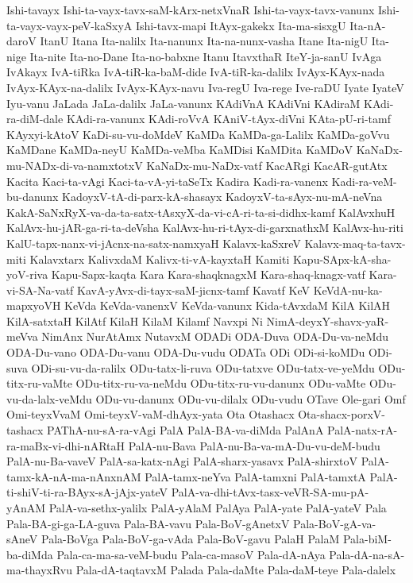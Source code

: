 {Ishi-tavayx
Ishi-ta-vayx-tavx-saM-kArx-netxVnaR
Ishi-ta-vayx-tavx-vanunx
Ishi-ta-vayx-vayx-peV-kaSxyA
Ishi-tavx-mapi
ItAyx-gakekx
Ita-ma-sisxgU
Ita-nA-daroV
ItanU
Itana
Ita-nalilx
Ita-nanunx
Ita-na-nunx-vasha
Itane
Ita-nigU
Ita-nige
Ita-nite
Ita-no-Dane
Ita-no-babxne
Itanu
ItavxthaR
IteY-ja-sanU
IvAga
IvAkayx
IvA-tiRka
IvA-tiR-ka-baM-dide
IvA-tiR-ka-dalilx
IvAyx-KAyx-nada
IvAyx-KAyx-na-dalilx
IvAyx-KAyx-navu
Iva-regU
Iva-rege
Ive-raDU
Iyate
IyateV
Iyu-vanu
JaLada
JaLa-dalilx
JaLa-vanunx
KAdiVnA
KAdiVni
KAdiraM
KAdi-ra-diM-dale
KAdi-ra-vanunx
KAdi-roVvA
KAniV-tAyx-diVni
KAta-pU-ri-tamf
KAyxyi-kAtoV
KaDi-su-vu-doMdeV
KaMDa
KaMDa-ga-Lalilx
KaMDa-goVvu
KaMDane
KaMDa-neyU
KaMDa-veMba
KaMDisi
KaMDita
KaMDoV
KaNaDx-mu-NADx-di-va-namxtotxV
KaNaDx-mu-NaDx-vatf
KacARgi
KacAR-gutAtx
Kacita
Kaci-ta-vAgi
Kaci-ta-vA-yi-taSeTx
Kadira
Kadi-ra-vanenx
Kadi-ra-veM-bu-danunx
KadoyxV-tA-di-parx-kA-shasayx
KadoyxV-ta-sAyx-nu-mA-neVna
KakA-SaNxRyX-va-da-ta-satx-tAsxyX-da-vi-cA-ri-ta-si-didhx-kamf
KalAvxhuH
KalAvx-hu-jAR-ga-ri-ta-deVsha
KalAvx-hu-ri-tAyx-di-garxnathxM
KalAvx-hu-riti
KalU-tapx-nanx-vi-jAcnx-na-satx-namxyaH
Kalavx-kaSxreV
Kalavx-maq-ta-tavx-miti
Kalavxtarx
KalivxdaM
Kalivx-ti-vA-kayxtaH
Kamiti
Kapu-SApx-kA-sha-yoV-riva
Kapu-Sapx-kaqta
Kara
Kara-shaqknagxM
Kara-shaq-knagx-vatf
Kara-vi-SA-Na-vatf
KavA-yAvx-di-tayx-saM-jicnx-tamf
Kavatf
KeV
KeVdA-nu-ka-mapxyoVH
KeVda
KeVda-vanenxV
KeVda-vanunx
Kida-tAvxdaM
KilA
KilAH
KilA-satxtaH
KilAtf
KilaH
KilaM
Kilamf
Navxpi
Ni
NimA-deyxY-shavx-yaR-meVva
NimAnx
NurAtAmx
NutavxM
ODADi
ODA-Duva
ODA-Du-va-neMdu
ODA-Du-vano
ODA-Du-vanu
ODA-Du-vudu
ODATa
ODi
ODi-si-koMDu
ODi-suva
ODi-su-vu-da-ralilx
ODu-tatx-li-ruva
ODu-tatxve
ODu-tatx-ve-yeMdu
ODu-titx-ru-vaMte
ODu-titx-ru-va-neMdu
ODu-titx-ru-vu-danunx
ODu-vaMte
ODu-vu-da-lalx-veMdu
ODu-vu-danunx
ODu-vu-dilalx
ODu-vudu
OTave
Ole-gari
Omf
Omi-teyxVvaM
Omi-teyxV-vaM-dhAyx-yata
Ota
Otashacx
Ota-shacx-porxV-tashacx
PAThA-nu-sA-ra-vAgi
PalA
PalA-BA-va-diMda
PalAnA
PalA-natx-rA-ra-maBx-vi-dhi-nARtaH
PalA-nu-Bava
PalA-nu-Ba-va-mA-Du-vu-deM-budu
PalA-nu-Ba-vaveV
PalA-sa-katx-nAgi
PalA-sharx-yasavx
PalA-shirxtoV
PalA-tamx-kA-nA-ma-nAnxnAM
PalA-tamx-neYva
PalA-tamxni
PalA-tamxtA
PalA-ti-shiV-ti-ra-BAyx-sA-jAjx-yateV
PalA-va-dhi-tAvx-tasx-veVR-SA-mu-pA-yAnAM
PalA-va-sethx-yalilx
PalA-yAlaM
PalAya
PalA-yate
PalA-yateV
Pala
Pala-BA-gi-ga-LA-guva
Pala-BA-vavu
Pala-BoV-gAnetxV
Pala-BoV-gA-va-sAneV
Pala-BoVga
Pala-BoV-ga-vAda
Pala-BoV-gavu
PalaH
PalaM
Pala-biM-ba-diMda
Pala-ca-ma-sa-veM-budu
Pala-ca-masoV
Pala-dA-nAya
Pala-dA-na-sA-ma-thayxRvu
Pala-dA-taqtavxM
Palada
Pala-daMte
Pala-daM-teye
Pala-dalelx
}
